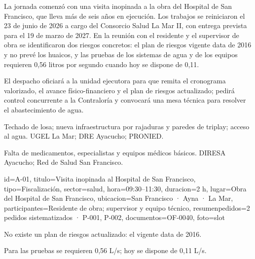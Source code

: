 \documentclass{informe-sr}
\begin{document}
\clearpage
{}
\begin{columnas}
La jornada comenzó con una visita inopinada a la obra del Hospital de
San Francisco, que lleva más de seis años en ejecución. Los trabajos se
reiniciaron el 23 de junio de 2026 a cargo del Consorcio Salud La Mar
II, con entrega prevista para el 19 de marzo de 2027. En la reunión con
el residente y el supervisor de obra se identificaron dos riesgos
concretos: el plan de riesgos vigente data de 2016 y no prevé los
huaicos, y las pruebas de los sistemas de agua y de los equipos
requieren 0,56 litros por segundo cuando hoy se dispone de 0,11.

El despacho oficiará a la unidad ejecutora para que remita el
cronograma valorizado, el avance físico-financiero y el plan de riesgos
actualizado; pedirá control concurrente a la Contraloría y convocará
una mesa técnica para resolver el abastecimiento de agua.
\end{columnas}
\begin{isrpedidos}
  \item[P-011] Techado de losa; nueva infraestructura por rajaduras y paredes de triplay; acceso al agua. {\isrtxmeta UGEL La Mar; DRE Ayacucho; PRONIED.}
  \item[P-027] Falta de medicamentos, especialistas y equipos médicos básicos. {\isrtxmeta DIRESA Ayacucho; Red de Salud San Francisco.}
\end{isrpedidos}


\begin{fichaactividad}{id={A-01}, titulo={Visita inopinada al Hospital de San
  Francisco}, tipo={Fiscalización}, sector={salud}, hora={09:30–11:30},
  duracion={2 h}, lugar={Obra del Hospital de San Francisco},
  ubicacion={San Francisco · Ayna · La Mar},
  participantes={Residente de obra; supervisor y equipo técnico},
  resumenpedidos={2 pedidos sistematizados · P-001, P-002},
  documentos={OF-0040}, foto={slot}}
  \begin{isrhallazgos}
    \item No existe un plan de riesgos actualizado: el vigente data de 2016.
    \item Para las pruebas se requieren 0,56 L/s; hoy se dispone de 0,11 L/s.
  \end{isrhallazgos}
\end{fichaactividad}
\end{document}
